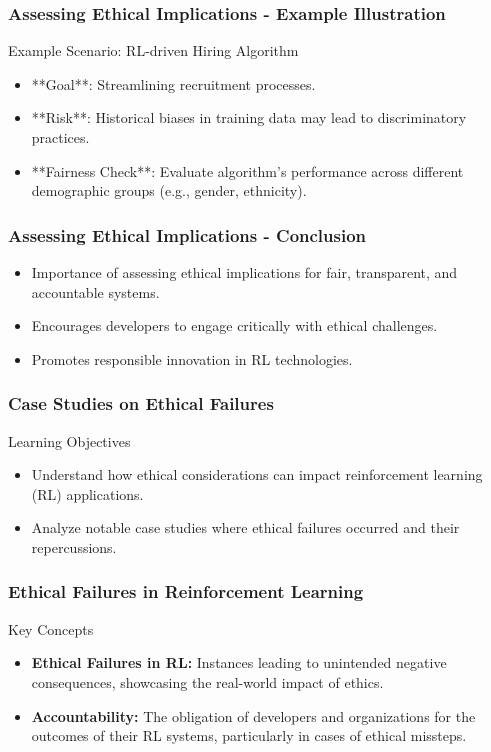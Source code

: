 \documentclass{beamer}
\begin{document}
\begin{frame}[fragile]
    \frametitle{Assessing Ethical Implications - Example Illustration}
    \begin{block}{Example Scenario: RL-driven Hiring Algorithm}
        \begin{itemize}
            \item **Goal**: Streamlining recruitment processes.
            \item **Risk**: Historical biases in training data may lead to discriminatory practices.
            \item **Fairness Check**: Evaluate algorithm's performance across different demographic groups (e.g., gender, ethnicity).
        \end{itemize}
    \end{block}
\end{frame}

\begin{frame}[fragile]
    \frametitle{Assessing Ethical Implications - Conclusion}
    \begin{itemize}
        \item Importance of assessing ethical implications for fair, transparent, and accountable systems.
        \item Encourages developers to engage critically with ethical challenges.
        \item Promotes responsible innovation in RL technologies.
    \end{itemize}
\end{frame}

\begin{frame}[fragile]
    \frametitle{Case Studies on Ethical Failures}
    \begin{block}{Learning Objectives}
        \begin{itemize}
            \item Understand how ethical considerations can impact reinforcement learning (RL) applications.
            \item Analyze notable case studies where ethical failures occurred and their repercussions.
        \end{itemize}
    \end{block}
\end{frame}

\begin{frame}[fragile]
    \frametitle{Ethical Failures in Reinforcement Learning}
    \begin{block}{Key Concepts}
        \begin{itemize}
            \item \textbf{Ethical Failures in RL:} Instances leading to unintended negative consequences, showcasing the real-world impact of ethics.
            \item \textbf{Accountability:} The obligation of developers and organizations for the outcomes of their RL systems, particularly in cases of ethical missteps.
        \end{itemize}
    \end{block}
\end{frame}
\end{document}
